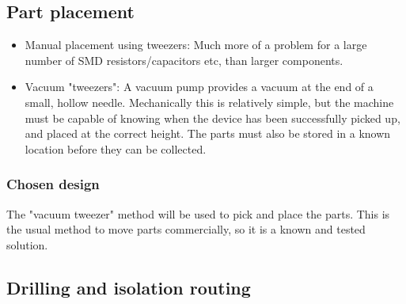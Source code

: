 



\subsection{Part placement}

\begin{itemize}
	\item	Manual placement using tweezers: Much more of a problem for a large number of SMD resistors/capacitors etc, than
		larger components. 
	\item	Vacuum "tweezers": A vacuum pump provides a vacuum at the end of a small, hollow needle. Mechanically this is relatively simple, but the machine must be capable
			of knowing when the device has been successfully picked up, and placed at the correct height. The parts must also be stored in a known location before they can be
			collected.
\end{itemize}

\subsubsection{Chosen design}
The "vacuum tweezer" method will be used to pick and place the parts. This is the usual method to move parts commercially, so it is a known and tested solution.



\subsection{Drilling and isolation routing}



